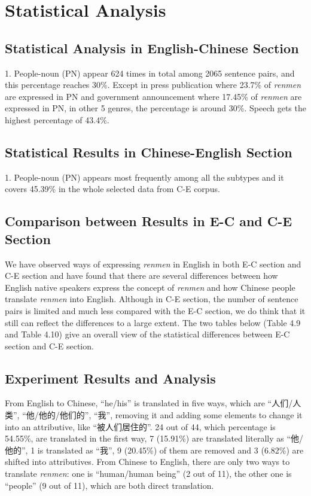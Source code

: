 \documentclass[degree=bachelor,language=english]{sysuthesis}
\begin{document}
\section{Statistical Analysis}

\subsection{Statistical Analysis in English-Chinese Section}

1. People-noun (PN) appear 624 times in total among 2065 sentence pairs, and this percentage reaches 30\%. Except in press publication where 23.7\% of \emph{renmen} are expressed in PN and government announcement where 17.45\% of \emph{renmen} are expressed in PN, in other 5 genres, the percentage is around 30\%. Speech gets the highest percentage of 43.4\%.


\subsection{Statistical Results in Chinese-English Section}

1. People-noun (PN) appears most frequently among all the subtypes and it covers 45.39\% in the whole selected data from C-E corpus.


\subsection{Comparison between Results in E-C and C-E Section}

We have observed ways of expressing \emph{renmen} in English in both E-C section and C-E section and have found that there are several differences between how English native speakers express the concept of \emph{renmen} and how Chinese people translate \emph{renmen} into English. Although in C-E section, the number of sentence pairs is limited and much less compared with the E-C section, we do think that it still can reflect the differences to a large extent. The two tables below (Table 4.9 and Table 4.10) give an overall view of the statistical differences between E-C section and C-E section.


\subsection{Experiment Results and Analysis}

From English to Chinese, “he/his” is translated in five ways, which are “人们/人类”, “他/他的/他们的”, “我”, removing it and adding some elements to change it into an attributive, like “被人们居住的”. 24 out of 44, which percentage is 54.55\%, are translated in the first way, 7 (15.91\%) are translated literally as “他/他的”, 1 is translated as “我”, 9 (20.45\%) of them are removed and 3 (6.82\%) are shifted into attributives. From Chinese to English, there are only two ways to translate \emph{renmen}: one is “human/human being” (2 out of 11), the other one is “people” (9 out of 11), which are both direct translation.
\end{document}
